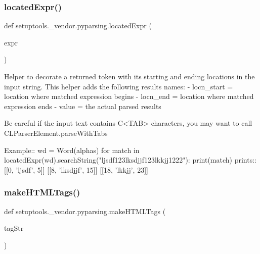 \subsubsection{\texorpdfstring{located\+Expr()}{locatedExpr()}}
{\footnotesize\ttfamily def setuptools.\+\_\+vendor.\+pyparsing.\+located\+Expr (\begin{DoxyParamCaption}\item[{}]{expr }\end{DoxyParamCaption})}

\begin{DoxyVerb}Helper to decorate a returned token with its starting and ending locations in the input string.
This helper adds the following results names:
 - locn_start = location where matched expression begins
 - locn_end = location where matched expression ends
 - value = the actual parsed results

Be careful if the input text contains C{<TAB>} characters, you may want to call
C{L{ParserElement.parseWithTabs}}

Example::
    wd = Word(alphas)
    for match in locatedExpr(wd).searchString("ljsdf123lksdjjf123lkkjj1222"):
        print(match)
prints::
    [[0, 'ljsdf', 5]]
    [[8, 'lksdjjf', 15]]
    [[18, 'lkkjj', 23]]
\end{DoxyVerb}
 \mbox{\label{namespacesetuptools_1_1__vendor_1_1pyparsing_a3f5e7079371168bf80f02d631ef41bac}} 
\subsubsection{\texorpdfstring{make\+H\+T\+M\+L\+Tags()}{makeHTMLTags()}}
{\footnotesize\ttfamily def setuptools.\+\_\+vendor.\+pyparsing.\+make\+H\+T\+M\+L\+Tags (\begin{DoxyParamCaption}\item[{}]{tag\+Str }\end{DoxyParamCaption})}

